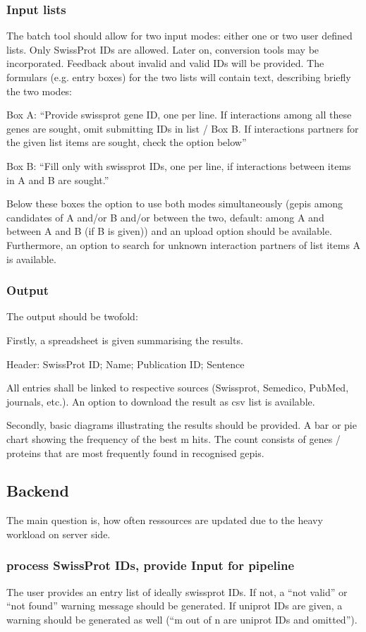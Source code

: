 \documentclass[a4paper,10pt]{article}
\begin{document}
\subsubsection{Input lists}
The batch tool should allow for two input modes: either one or two user defined lists. Only SwissProt IDs are allowed. Later on, conversion tools may be incorporated. Feedback about invalid and valid IDs will be provided.
The formulars (e.g. entry boxes) for the two lists will contain text, describing briefly the two modes:

Box A: ``Provide swissprot gene ID, one per line. If interactions among all these genes are sought, omit submitting IDs in list / Box B. If interactions partners for the given list items are sought, check the option below''

Box B: ``Fill only with swissprot IDs, one per line, if interactions between items in A and B are sought.''

Below these boxes the option to use both modes simultaneously (gepis among candidates of A and/or B and/or between the two, default: among A and between A and B (if B is given)) and an upload option should be available. Furthermore, an option to search for unknown interaction partners of list items A is available.

\subsubsection{Output}
The output should be twofold:

Firstly, a spreadsheet is given summarising the results.

Header: SwissProt ID; Name; Publication ID; Sentence

All entries shall be linked to respective sources (Swissprot, Semedico, Pub\-Med, journals, etc.).
An option to download the result as csv list is available.

Secondly, basic diagrams illustrating the results should be provided. A bar or pie chart showing the frequency of the best m hits. The count consists of genes / proteins that are most frequently found in recognised gepis.

\subsection{Backend}
The main question is, how often ressources are updated due to the heavy workload on server side.

\subsubsection{process SwissProt IDs, provide Input for pipeline}
The user provides an entry list of ideally swissprot IDs. If not, a ``not valid'' or ``not found'' warning message should be generated. If uniprot IDs are given, a warning should be generated as well (``m out of n are uniprot IDs and omitted'').
\end{document}

